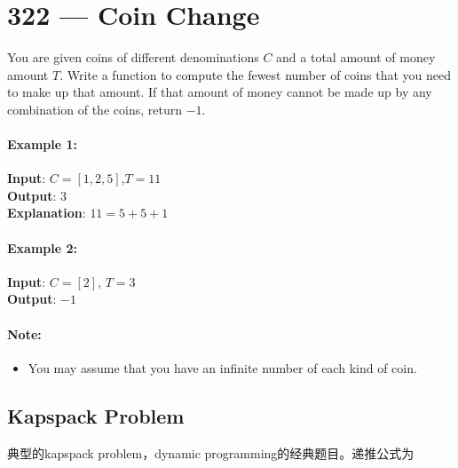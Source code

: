 \section{322 --- Coin Change}
You are given coins of different denominations $C$ and a total amount of money amount $T$. Write a function to compute the fewest number of coins that you need to make up that amount. If that amount of money cannot be made up by any combination of the coins, return $-1$.

\paragraph{Example 1:}

\begin{flushleft}
\textbf{Input}: $C = [1, 2, 5]$,\quad $T = 11$
\\
\textbf{Output}: 3 
\\
\textbf{Explanation}: $ 11 = 5 + 5 + 1 $
\end{flushleft}

\paragraph{Example 2:}

\begin{flushleft}
\textbf{Input}: $C = [2]$, \quad $T = 3$
\\
\textbf{Output}: $ -1 $
\end{flushleft}

\paragraph{Note:}
\begin{itemize}
\item You may assume that you have an infinite number of each kind of coin.
\end{itemize}
\subsection{Kapspack Problem}
典型的kapspack problem，dynamic programming的经典题目。递推公式为


